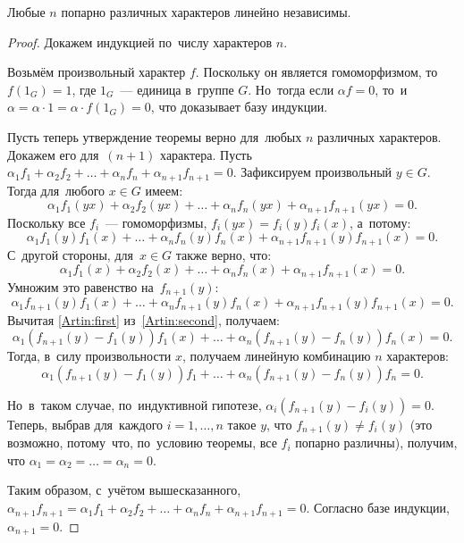 \documentclass[a4paper,oneside]{article}
\begin{document}
\begin{theorem*}[Артин]
    Любые $n$ попарно различных характеров линейно независимы.
\end{theorem*}

\begin{proof}

Докажем индукцией по~числу характеров $n$.

Возьмём произвольный характер $f$. Поскольку он является гомоморфизмом,
то~$f(1_G) = 1$, где $1_G$~— единица в~группе $G$. Но~тогда если $\alpha f = 0$,
то~и~$\alpha = \alpha \cdot 1 = \alpha \cdot f(1_G) = 0$, что доказывает базу индукции.

Пусть теперь утверждение теоремы верно для~любых $n$ различных характеров. Докажем его для~$(n + 1)$ характера.
Пусть $\alpha_1 f_1 + \alpha_2 f_2 + \ldots + \alpha_n f_n + \alpha_{n + 1} f_{n + 1} = 0$.
Зафиксируем произвольный $y \in G$. Тогда для~любого $x \in G$ имеем:
\begin{equation}\label{Artin:first}
    \alpha_1 f_1(yx) + \alpha_2 f_2(yx) + \ldots + \alpha_n f_n(yx) + \alpha_{n + 1} f_{n + 1}(yx) = 0.
\end{equation}
Поскольку все $f_i$~— гомоморфизмы, $f_i(yx) = f_i(y) f_i(x)$, а~потому:
$$
    \alpha_1 f_1(y) f_1(x) + \ldots + \alpha_n f_n(y) f_n(x) + \alpha_{n + 1} f_{n + 1}(y) f_{n + 1}(x) = 0.
$$
С~другой стороны, для~$x \in G$ также верно, что:
$$
    \alpha_1 f_1(x) + \alpha_2 f_2(x) + \ldots + \alpha_n f_n(x) + \alpha_{n + 1} f_{n + 1}(x) = 0.
$$
Умножим это равенство на~$f_{n + 1}(y)$:
\begin{equation}\label{Artin:second}
    \alpha_1 f_{n + 1}(y) f_1(x) + \ldots + \alpha_n f_{n + 1}(y) f_n(x) + \alpha_{n + 1} f_{n + 1}(y) f_{n + 1}(x) = 0.
\end{equation}
Вычитая \eqref{Artin:first} из~\eqref{Artin:second}, получаем:
$$
    \alpha_1 (f_{n + 1}(y) - f_1(y)) f_1(x) + \ldots + \alpha_n (f_{n + 1}(y) - f_n(y)) f_n(x) = 0.
$$
Тогда, в~силу произвольности $x$, получаем линейную комбинацию $n$ характеров:
$$
    \alpha_1 (f_{n + 1}(y) - f_1(y)) f_1 + \ldots + \alpha_n (f_{n + 1}(y) - f_n(y)) f_n = 0.
$$

Но~в~таком случае, по~индуктивной гипотезе, $\alpha_i (f_{n + 1}(y) - f_i(y)) = 0$.
Теперь, выбрав для~каждого $i = 1, \ldots, n$ такое $y$, что $f_{n + 1}(y) \neq f_i(y)$
(это возможно, потому~что, по~условию теоремы, все $f_i$ попарно различны), получим,
что $\alpha_1 = \alpha_2 = \ldots = \alpha_n = 0$.

Таким образом, с~учётом вышесказанного, $\alpha_{n + 1} f_{n + 1} = \alpha_1 f_1 + \alpha_2 f_2 + \ldots + \alpha_n f_n + \alpha_{n + 1} f_{n + 1} = 0$.
Согласно базе индукции, $\alpha_{n + 1} = 0$.
\end{proof}
\end{document}
